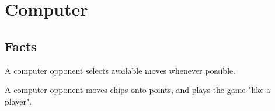 \section{Computer}

\subsection{Facts}

\begin{dashed}
    \item A computer opponent selects available moves whenever possible.
    \item A computer opponent moves chips onto points, and plays
    the game "like a player".
\end{dashed}

